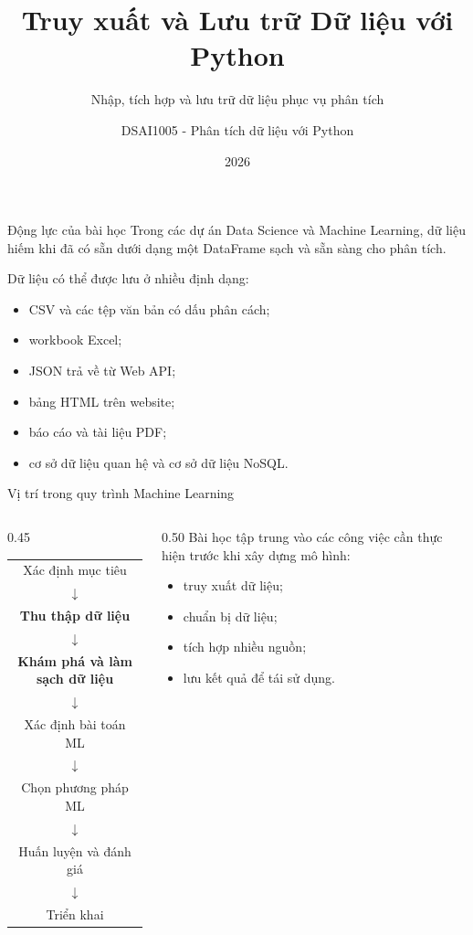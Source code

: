 \documentclass[aspectratio=169,11pt]{beamer}
\title[Truy xuất và Lưu trữ Dữ liệu]{Truy xuất và Lưu trữ Dữ liệu với Python}
\subtitle{Nhập, tích hợp và lưu trữ dữ liệu phục vụ phân tích}
\author{DSAI1005 - Phân tích dữ liệu với Python}
\institute{Khoa Khoa học Dữ liệu và Trí tuệ Nhân tạo\\Đại học Kinh tế Quốc dân}
\date{2026}
\newcommand{\smallgap}{\vspace{0.4em}}
\begin{document}
\begin{frame}
  \titlepage
\end{frame}

\begin{frame}{Động lực của bài học}
Trong các dự án Data Science và Machine Learning, dữ liệu hiếm khi đã có sẵn dưới dạng một DataFrame sạch và sẵn sàng cho phân tích.

\smallgap
Dữ liệu có thể được lưu ở nhiều định dạng:
\begin{itemize}
  \item CSV và các tệp văn bản có dấu phân cách;
  \item workbook Excel;
  \item JSON trả về từ Web API;
  \item bảng HTML trên website;
  \item báo cáo và tài liệu PDF;
  \item cơ sở dữ liệu quan hệ và cơ sở dữ liệu NoSQL.
\end{itemize}
\end{frame}

\begin{frame}{Vị trí trong quy trình Machine Learning}
\begin{columns}[T]
\begin{column}{0.45\textwidth}
\begin{center}
\small
\begin{tabular}{c}
Xác định mục tiêu \\
$\downarrow$ \\
\textbf{Thu thập dữ liệu} \\
$\downarrow$ \\
\textbf{Khám phá và làm sạch dữ liệu} \\
$\downarrow$ \\
Xác định bài toán ML \\
$\downarrow$ \\
Chọn phương pháp ML \\
$\downarrow$ \\
Huấn luyện và đánh giá \\
$\downarrow$ \\
Triển khai
\end{tabular}
\end{center}
\end{column}
\begin{column}{0.50\textwidth}
Bài học tập trung vào các công việc cần thực hiện trước khi xây dựng mô hình:
\begin{itemize}
  \item truy xuất dữ liệu;
  \item chuẩn bị dữ liệu;
  \item tích hợp nhiều nguồn;
  \item lưu kết quả để tái sử dụng.
\end{itemize}
\end{column}
\end{columns}
\end{frame}
\end{document}
